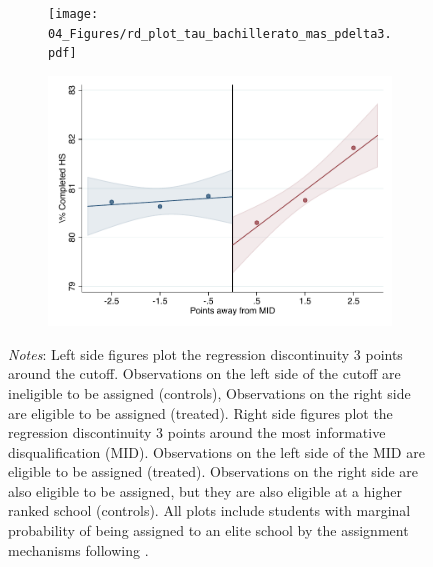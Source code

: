 \documentclass[oneside,11pt]{article}
\begin{document}
\begin{figure}[H]
\begin{center}
    \begin{subfigure}{0.475\textwidth}
        \centering
        \texttt{[image: 04\_Figures/rd\_plot\_tau\_bachillerato\_mas\_pdelta3.pdf]}
    \end{subfigure}
    \begin{subfigure}{0.475\textwidth}
        \centering
        \includegraphics[width=\textwidth]{04_Figures/rd_plot_mid_bachillerato_mas_pdelta3.pdf}
    \end{subfigure}
    \end{center}
    
\footnotesize
\textit{Notes}: Left side figures plot the regression discontinuity 3 points around the cutoff. Observations on the left side of the cutoff are ineligible to be assigned (controls), Observations on the right side are eligible to be assigned (treated). Right side figures plot the regression discontinuity 3 points around the most informative disqualification (MID). Observations on the left side of the MID are eligible to be assigned (treated). Observations on the right side are also eligible to be assigned, but they are also eligible at a higher ranked school (controls). All plots include students with marginal probability of being assigned to an elite school by the assignment mechanisms following \citet{abdulkadirouglu2022breaking}. 
\end{figure}
\end{document}
